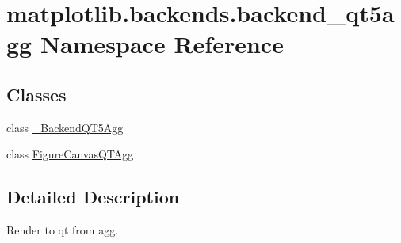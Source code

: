 \hypertarget{namespacematplotlib_1_1backends_1_1backend__qt5agg}{}\section{matplotlib.\+backends.\+backend\+\_\+qt5agg Namespace Reference}
\label{namespacematplotlib_1_1backends_1_1backend__qt5agg}
\subsection*{Classes}
\begin{DoxyCompactItemize}
\item 
class \hyperlink{classmatplotlib_1_1backends_1_1backend__qt5agg_1_1__BackendQT5Agg}{\+\_\+\+Backend\+Q\+T5\+Agg}
\item 
class \hyperlink{classmatplotlib_1_1backends_1_1backend__qt5agg_1_1FigureCanvasQTAgg}{Figure\+Canvas\+Q\+T\+Agg}
\end{DoxyCompactItemize}


\subsection{Detailed Description}
\begin{DoxyVerb}Render to qt from agg.
\end{DoxyVerb}
 